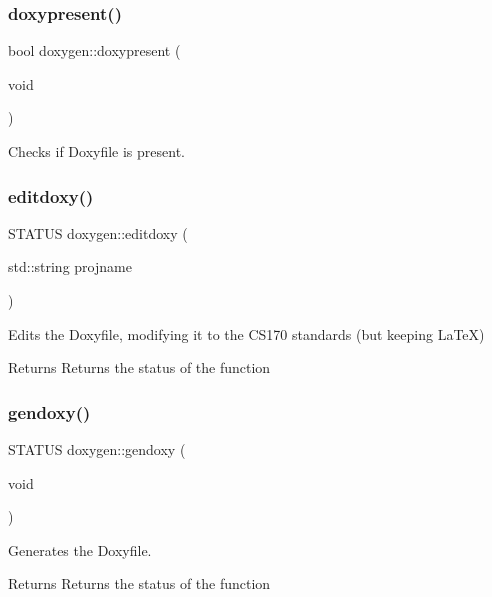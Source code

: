 \subsubsection{\texorpdfstring{doxypresent()}{doxypresent()}}
{\footnotesize\ttfamily bool doxygen\+::doxypresent (\begin{DoxyParamCaption}\item[{void}]{ }\end{DoxyParamCaption})}



Checks if Doxyfile is present. 

\mbox{\label{namespacedoxygen_a5c6a31d9a2fe806735c143e190d1f462}} 
\subsubsection{\texorpdfstring{editdoxy()}{editdoxy()}}
{\footnotesize\ttfamily S\+T\+A\+T\+US doxygen\+::editdoxy (\begin{DoxyParamCaption}\item[{std\+::string}]{projname }\end{DoxyParamCaption})}



Edits the Doxyfile, modifying it to the C\+S170 standards (but keeping La\+TeX) 

\begin{DoxyReturn}{Returns}
Returns the status of the function 
\end{DoxyReturn}
\mbox{\label{namespacedoxygen_a5c87bdeb24d13f1c2a9024fd7e95c322}} 
\subsubsection{\texorpdfstring{gendoxy()}{gendoxy()}}
{\footnotesize\ttfamily S\+T\+A\+T\+US doxygen\+::gendoxy (\begin{DoxyParamCaption}\item[{void}]{ }\end{DoxyParamCaption})}



Generates the Doxyfile. 

\begin{DoxyReturn}{Returns}
Returns the status of the function 
\end{DoxyReturn}
\mbox{\label{namespacedoxygen_a57d0262c121e64948a97830bb84e480c}} 
